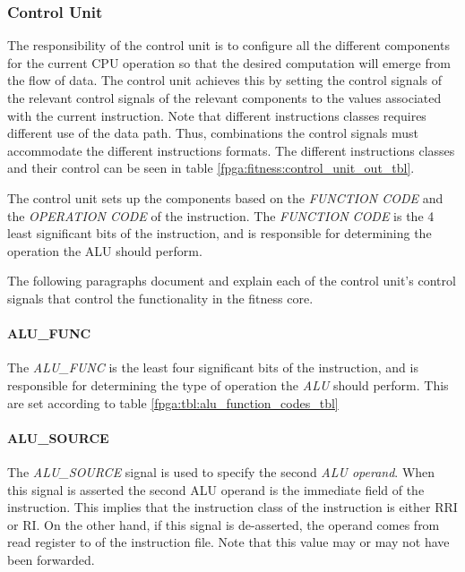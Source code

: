 \subsubsection{Control Unit} 
The responsibility of the control unit is to configure all the different components for the current CPU operation so that the desired computation will emerge from the flow of data.
The control unit achieves this by setting the control signals of the relevant control signals of the relevant components to the values associated with the current instruction.
Note that different instructions classes requires different use of the data path.
Thus, combinations the control signals must accommodate the different instructions formats. The different instructions classes and their control can be seen in table \ref{fpga:fitness:control_unit_out_tbl}. 

The control unit sets up the components based on the \emph{FUNCTION CODE} and the \emph{OPERATION CODE} of the instruction. The \emph{FUNCTION CODE} is the 4 least significant bits of the instruction, and is responsible for determining the operation the ALU should perform. 

 

 









The following paragraphs document and explain each of the control unit's control signals that control the functionality in the fitness core.

\paragraph{ALU\_FUNC}
The \emph{ALU\_FUNC} is the least four significant bits of the instruction, and is responsible for determining the type of operation the \emph{ALU} should perform. This are set according to table \ref{fpga:tbl:alu_function_codes_tbl} 




\paragraph{ALU\_SOURCE}
The \emph{ALU\_SOURCE} signal is used to specify the second \emph{ALU operand}. When this signal is asserted the second ALU operand is the immediate field of the instruction. This implies that the instruction class of the instruction is either RRI or RI. On the other hand, if this signal is de-asserted, the operand comes from read register to of the instruction file. Note that this value may or may not have been forwarded. 

